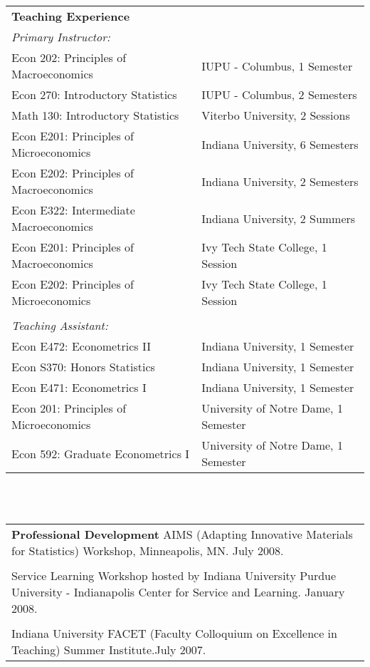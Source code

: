 \begin{tabular}{p{3in}p{3in}}
\textbf{Teaching Experience} & \\
\emph{Primary Instructor:} & \\
Econ 202: Principles of Macroeconomics & IUPU - Columbus, 1 Semester \\
Econ 270: Introductory Statistics & IUPU - Columbus, 2 Semesters \\
Math 130: Introductory Statistics & Viterbo University, 2 Sessions \\
Econ E201: Principles of Microeconomics & Indiana University, 6 Semesters \\
Econ E202: Principles of Macroeconomics & Indiana University, 2 Semesters \\
Econ E322: Intermediate Macroeconomics & Indiana University, 2 Summers \\
Econ E201: Principles of Macroeconomics & Ivy Tech State College, 1 Session \\
Econ E202: Principles of Microeconomics & Ivy Tech State College, 1 Session \\ \\
\emph{Teaching Assistant:} & \\
Econ E472: Econometrics II & Indiana University, 1 Semester \\
Econ S370: Honors Statistics & Indiana University, 1 Semester \\
Econ E471: Econometrics I & Indiana University, 1 Semester \\
Econ 201: Principles of Microeconomics & University of Notre Dame, 1 Semester \\
Econ 592: Graduate Econometrics I & University of Notre Dame, 1 Semester \\
\end{tabular} \\ \\

\begin{tabular}{p{5.5in}}
\textbf{Professional Development} \newline
AIMS (Adapting Innovative Materials for Statistics) Workshop, Minneapolis, MN.  July 2008.\\\\
Service Learning Workshop hosted by Indiana University Purdue University - Indianapolis Center for Service and Learning.  January 2008.\\\\
Indiana University FACET (Faculty Colloquium on Excellence in Teaching) Summer Institute.\newline July 2007.
\end{tabular} \\ \\

